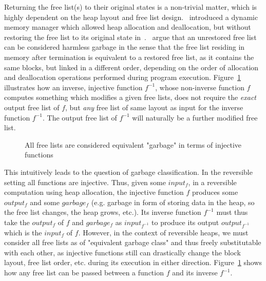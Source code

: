 Returning the free list(s) to their original states is a non-trivial matter, which is highly dependent on the heap layout and free list design.~\citeauthor{ha:heap} introduced a dynamic memory manager which allowed heap allocation and deallocation, but without restoring the free list to its original state in~\cite{ha:heap}.~\citeauthor{ha:heap} argue that an unrestored free list can be considered harmless garbage in the sense that the free list residing in memory after termination is equivalent to a restored free list, as it contains the same blocks, but linked in a different order, depending on the order of allocation and deallocation operations performed during program execution. Figure~\ref{fig:equivalent-free-lists} illustrates how an inverse, injective function $f^{-1}$, whose non-inverse function $f$ computes something which modifies a given free lists, does not require the \textit{exact} output free list of $f$, but \textit{any} free list of same layout as input for the inverse function $f^{-1}$. The output free list of $f^{-1}$ will naturally be a further modified free list.

\begin{figure}[ht]
  \centering
  \caption{All free lists are considered equivalent "garbage" in terms of injective functions}
  \label{fig:equivalent-free-lists}
\end{figure}

This intuitively leads to the question of garbage classification. In the reversible setting all functions are injective. Thus, given some $input_f$, in a reversible computation using heap allocation, the injective function $f$ produces some $output_f$ and some $garbage_f$ (e.g. garbage in form of storing data in the heap, so the free list changes, the heap grows, etc.). Its inverse function $f^{-1}$ must thus take the $output_f$ of $f$ and $garbage_f$ as $input_{f^{-1}}$ to produce its output $output_{f^{-1}}$ which is the $input_f$ of $f$. However, in the context of reversible heaps, we must consider all free lists as of "equivalent garbage class" and thus freely substitutable with each other, as injective functions still can drastically change the block layout, free list order, etc. during its execution in either direction. Figure~\ref{fig:equivalent-free-lists} shows how any free list can be passed between a function $f$ and its inverse $f^{-1}$.


